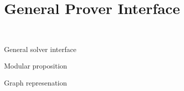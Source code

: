\section{General Prover Interface}~\label{sec:interface}

General solver interface

Modular proposition

Graph represenation 



